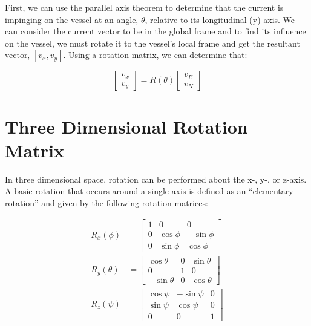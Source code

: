 First, we can use the parallel axis theorem to determine that the current is impinging on the vessel at an angle, $\theta$, relative to its longitudinal (y) axis.
We can consider the current vector to be in the global frame and to find its influence on the vessel, we must rotate it to the vessel's local frame and get the resultant vector, $[v_x, v_y]$.
Using a rotation matrix, we can determine that:

\begin{equation*}
    \left[
        \begin{matrix}
            v_x \\
            v_y
        \end{matrix}
    \right] = 
    R(\theta) \left[
        \begin{matrix}
            v_E \\
            v_N
        \end{matrix}
    \right]
\end{equation*}

\section{Three Dimensional Rotation Matrix} 
In three dimensional space, rotation can be performed about the x-, y-, or z-axis. A basic rotation that occurs around a single axis is defined as an ``elementary rotation'' and given by the following rotation matrices:

\begin{align*}
    R_x(\phi) &= \left[
        \begin{matrix}
            1 & 0 & 0 \\
            0 & \cos\phi & -\sin\phi \\
            0 & \sin\phi & \cos\phi
        \end{matrix}
    \right] \\
    R_y(\theta) &= \left[
        \begin{matrix}
            \cos\theta & 0 & \sin\theta \\
            0 & 1 & 0 \\
            -\sin\theta & 0 & \cos\theta
        \end{matrix}
    \right] \\
    R_z(\psi) &= \left[
        \begin{matrix}
            \cos\psi & -\sin\psi & 0 \\
            \sin\psi & \cos\psi & 0 \\
            0 & 0 & 1
        \end{matrix}
    \right]
\end{align*}

